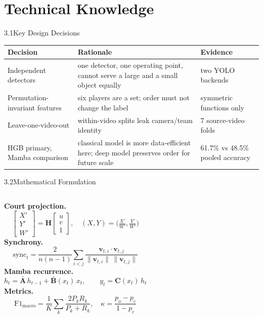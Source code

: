 \documentclass[aspectratio=169, 11pt]{beamer}
\renewcommand{\arraystretch}{1.15}
\begin{document}
\section{Technical Knowledge}

\begin{frame}[t]{3.1\quad Key Design Decisions}
    \scriptsize
    \renewcommand{\arraystretch}{1.05}
    \begin{tabular}{@{}p{3.4cm}p{5.8cm}p{3.6cm}@{}}
        \toprule \textbf{Decision} & \textbf{Rationale} & \textbf{Evidence} \\ \midrule
        Independent detectors & one detector, one operating point, cannot
        serve a large and a small object equally & two YOLO backends \\
        Permutation-invariant features & six players are a set; order must
        not change the label & symmetric functions only \\
        Leave-one-video-out & within-video splits leak camera/team
        identity & 7 source-video folds \\
        HGB primary, Mamba comparison & classical model is more
        data-efficient here; deep model preserves order for future scale &
        61.7\% vs 48.5\% pooled accuracy \\
        \bottomrule
    \end{tabular}
\end{frame}

\begin{frame}[t]{3.2\quad Mathematical Formulation}
    \small
    \begin{columns}[t]
        \textbf{Court projection.}
        \[
        \begin{bmatrix} X' \\ Y' \\ W' \end{bmatrix}
        = \mathbf{H}\begin{bmatrix} u \\ v \\ 1 \end{bmatrix},\quad
        (X,Y) = \Big(\tfrac{X'}{W'},\tfrac{Y'}{W'}\Big)
        \]
        \vspace{0.15cm}
        \textbf{Synchrony.}
        \[
        \text{sync}_t = \frac{2}{n(n-1)}\sum_{i<j}
        \frac{\mathbf{v}_{t,i}\cdot\mathbf{v}_{t,j}}
             {\lVert\mathbf{v}_{t,i}\rVert\,\lVert\mathbf{v}_{t,j}\rVert}
        \]
        \textbf{Mamba recurrence.}
        \[
        h_t = \bar{\mathbf{A}}\,h_{t-1} + \bar{\mathbf{B}}(x_t)\,x_t,\qquad
        y_t = \mathbf{C}(x_t)\,h_t
        \]
        \vspace{0.1cm}
        \textbf{Metrics.}
        \[
        \text{F1}_{\text{macro}} = \frac{1}{K}\sum_k \frac{2P_kR_k}{P_k+R_k},
        \quad \kappa = \frac{p_o - p_e}{1 - p_e}
        \]
    \end{columns}
\end{frame}
\end{document}
